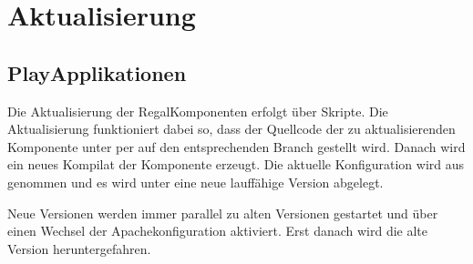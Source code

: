 \documentclass[letterpaper,10pt,english]{sphinxmanual}
\begin{document}
\begin{sphinxVerbatim}[commandchars=\\\{\}]
 
   
 
 
 
\end{sphinxVerbatim}


\section{Aktualisierung}
\label{\detokenize{toscience:aktualisierung}}\label{\detokenize{toscience:id63}}

\subsection{Play\sphinxhyphen{}Applikationen}
\label{\detokenize{toscience:play-applikationen}}\label{\detokenize{toscience:id64}}
\sphinxAtStartPar
Die Aktualisierung der Regal\sphinxhyphen{}Komponenten erfolgt über Skripte. Die
Aktualisierung funktioniert dabei so, dass der Quellcode der zu
aktualisierenden Komponente unter  per  auf den
entsprechenden Branch gestellt wird. Danach wird ein neues Kompilat der
Komponente erzeugt. Die aktuelle Konfiguration wird aus
 genommen und es wird unter  eine
neue lauffähige Version abgelegt.

\sphinxAtStartPar
Neue Versionen werden immer parallel zu alten Versionen gestartet und
über einen Wechsel der Apachekonfiguration aktiviert. Erst danach wird
die alte Version heruntergefahren.
\end{document}
